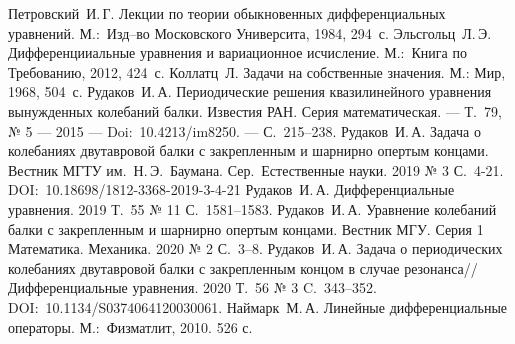 \documentclass[12pt, a4paper]{article}
\begin{document}
\begin{thebibliography}{9}
	 Петровский~И.\,Г. Лекции по теории обыкновенных дифференциальных уравнений.	М.:~Изд–во Московского Университа, 1984, 294~с.
	 Эльсгольц~Л.\,Э. Дифференцииальные уравнения и вариационное исчисление. М.:~Книга по Требованию, 2012, 424~с.
	 Коллатц~Л. Задачи на собственные значения. М.: Мир, 1968, 504~с.
	 Рудаков~И.\,А. Периодические решения квазилинейного уравнения вынужденных колебаний балки. Известия РАН. Серия математическая. --- Т.~79, № 5 --- 2015 --- Doi:~10.4213/im8250. --- С.~215--238.
	 Рудаков~И.\,А. Задача о колебаниях двутавровой балки с закрепленным и шарнирно опертым концами. Вестник МГТУ им.~Н.\,Э.~Баумана. Сер.~Естест\-вен\-ные науки. 2019 № 3 С.~4-21. DOI:~10.18698/1812-3368-2019-3-4-21
	 Рудаков~И.\,А.  Дифференциальные уравнения. 2019 Т.~55 № 11 С.~1581--1583.
	 Рудаков~И.\,А. Уравнение колебаний балки с закрепленным и шарнирно	опертым концами. Вестник МГУ. Серия 1 Математика. Механика. 2020 № 2	С.~3--8.
	 Рудаков~И.\,А. Задача о периодических колебаниях двутавровой балки с	закрепленным концом в случае резонанса// Дифференциальные уравнения.	2020 Т.~56 № 3 C.~343--352. DOI:~10.1134/S0374064120030061.
	 Наймарк~М.\,А. Линейные дифференциальные операторы. М.:~Физматлит, 2010. 526 с.
\end{thebibliography}
 
\end{document}
